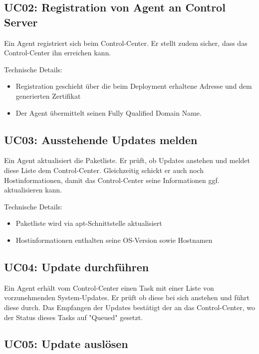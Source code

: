 \subsection*{UC02: Registration von Agent an Control Server}
\label{sec:uc_02}

Ein Agent registriert sich beim Control-Center. Er stellt zudem sicher, dass das Control-Center ihn erreichen kann.
 

Technische Details:

\begin{itemize}
    \item Registration geschieht über die beim Deployment erhaltene Adresse und dem generierten Zertifikat
    \item Der Agent übermittelt seinen Fully Qualified Domain Name.
\end{itemize}

\subsection*{UC03: Ausstehende Updates melden}
\label{sec:uc_03}

Ein Agent aktualisiert die Paketliste. Er prüft, ob Updates anstehen und meldet diese Liste dem Control-Center. Gleichzeitig schickt er auch noch Hostinformationen, damit das Control-Center seine Informationen ggf. aktualisieren kann.
 

Technische Details:

\begin{itemize}
    \item Paketliste wird via apt-Schnittstelle aktualisiert
    \item Hostinformationen enthalten seine OS-Version sowie Hostnamen
\end{itemize}

\subsection*{UC04: Update durchführen}
\label{sec:uc_04}

Ein Agent erhält vom Control-Center einen Task mit einer Liste von vorzunehmenden System-Updates. Er prüft ob diese bei sich anstehen und führt diese durch. Das Empfangen der Updates bestätigt der an das Control-Center, wo der Status dieses Tasks auf "Queued" gesetzt.

\subsection*{UC05: Update auslösen}
\label{sec:uc_05}

